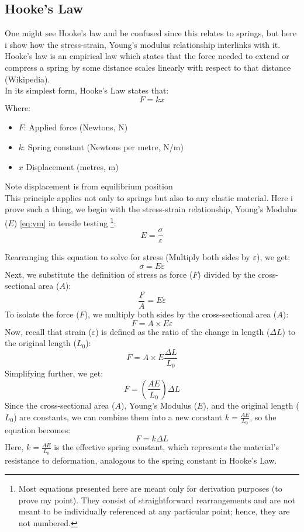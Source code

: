 \documentclass{article}
\begin{document}
    \subsection{Hooke's Law}
    One might see Hooke's law and be confused since this relates to springs, but here i show how the stress-strain, Young's modulus relationship interlinks with it. Hooke's law is an empirical law which states that the force needed to extend or compress a spring by some distance scales linearly with respect to that distance (Wikipedia).\\[8pt]
    In its simplest form, Hooke's Law states that:
    \begin{equation}
        F = kx
    \end{equation}
    Where:
    \begin{itemize}[itemsep=-1mm]
        \item $F$: Applied force (Newtons, N)
        \item $k$: Spring constant (Newtons per metre, N/m)
        \item $x$ Displacement (metres, m)
    \end{itemize}
    Note displacement is from equilibrium position\\[8pt] 
    This principle applies not only to springs but also to any elastic material. Here i prove such a thing, we begin with the stress-strain relationship, Young's Modulus (\(E\)) \ref{eq:ym} in tensile testing \footnote{Most equations presented here are meant only for derivation purposes (to prove my point). They consist of straightforward rearrangements and are not meant to be individually referenced at any particular point; hence, they are not numbered.}:    
    \[E = \frac{\sigma}{\varepsilon}\]
    \begin{center}
    Rearranging this equation to solve for stress (Multiply both sides by \(\varepsilon\)), we get:
    \[\sigma = E\varepsilon\]
    Next, we substitute the definition of stress as force (\(F\)) divided by the cross-sectional area (\(A\)):
    \[\frac{F}{A} = E\varepsilon\]
    To isolate the force (\(F\)), we multiply both sides by the cross-sectional area (\(A\)):
    \[F = A \times E\varepsilon\]
    Now, recall that strain (\(\varepsilon\)) is defined as the ratio of the change in length (\(\Delta L\)) to the original length (\(L_0\)):
    \[F = A \times E\frac{\Delta L}{L_0}\]
    Simplifying further, we get:
    \[F = \left(\frac{AE}{L_0}\right)\Delta L\]
    Since the cross-sectional area (\(A\)), Young's Modulus (\(E\)), and the original length (\(L_0\)) are constants, we can combine them into a new constant \(k = \frac{AE}{L_0}\), so the equation becomes:
    \begin{equation}
        F = k\Delta L
    \end{equation}
    Here, \(k = \frac{AE}{L_0}\) is the effective spring constant, which represents the material's resistance to deformation, analogous to the spring constant in Hooke's Law.    
    \end{center}
    \newpage
\end{document}
